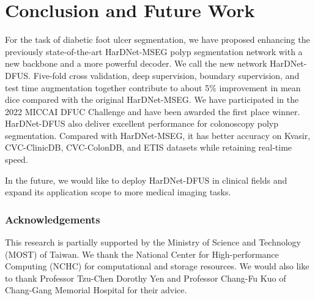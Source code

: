 \documentclass[runningheads]{llncs}
\begin{document}
\section{Conclusion and Future Work}

For the task of diabetic foot ulcer segmentation,
we have proposed enhancing the previously state-of-the-art HarDNet-MSEG
polyp segmentation network
with a new backbone and a more powerful decoder.
We call the new network HarDNet-DFUS.
Five-fold cross validation, deep supervision, boundary supervision, and
test time augmentation together contribute to about 5\% improvement
in mean dice compared with the original HarDNet-MSEG.
We have participated in the 2022 MICCAI DFUC Challenge and 
have been awarded the first place winner.
HarDNet-DFUS also deliver excellent performance for
colonoscopy polyp segmentation.
Compared with HarDNet-MSEG, it has better accuracy on
Kvasir, CVC-ClinicDB, CVC-ColonDB, and ETIS datasets
while retaining real-time speed.

In the future, we would like to deploy HarDNet-DFUS in
clinical fields and expand its application scope
to more medical imaging tasks.


\subsubsection{Acknowledgements}

This research is partially supported by
the Ministry of Science and Technology (MOST) of Taiwan.
We thank the National Center for High-performance Computing (NCHC) for
computational and storage resources.
We would also like to thank Professor Tzu-Chen Dorothy Yen and
Professor Chang-Fu Kuo of Chang-Gang Memorial Hospital for their advice.



\end{document}
